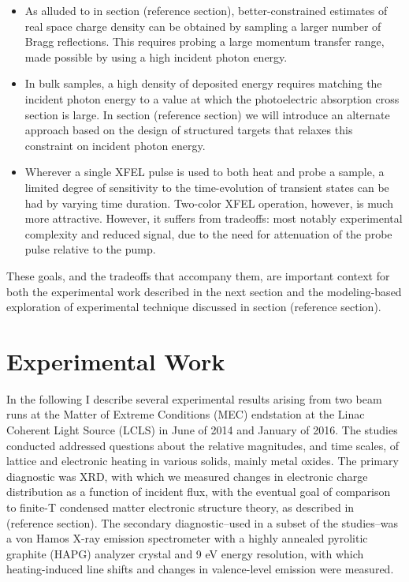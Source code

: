 \documentclass [11pt, proquest, article] {uwthesis}[2016/11/22]
\begin{document}
\begin{itemize}
\item{As alluded to in section (reference section), better-constrained estimates of real space charge density can be obtained by sampling a larger number of Bragg reflections. This requires probing a large momentum transfer range, made possible by using a high incident photon energy.}
\item{In bulk samples, a high density of deposited energy requires matching the incident photon energy to a value at which the photoelectric absorption cross section is large. In section (reference section) we will introduce an alternate approach based on the design of structured targets that relaxes this constraint on incident photon energy.}
\item{Wherever a single XFEL pulse is used to both heat and probe a sample, a limited degree of sensitivity to the time-evolution of transient states can be had by varying time duration. Two-color XFEL operation, however, is much more attractive. However, it suffers from tradeoffs: most notably experimental complexity and reduced signal, due to the need for attenuation of the probe pulse relative to the pump. }
\end{itemize}
These goals, and the tradeoffs that accompany them, are important context for both the experimental work described in the next section and the modeling-based exploration of experimental technique discussed in section (reference section).

\section{Experimental Work}
In the following I describe several experimental results arising from two beam runs at the Matter of Extreme Conditions (MEC) endstation at the Linac Coherent Light Source (LCLS) in June of 2014 and January of 2016. The studies conducted addressed questions about the relative magnitudes, and time scales, of lattice and electronic heating in various solids, mainly metal oxides. The primary diagnostic was XRD, with which we measured changes in electronic charge distribution as a function of incident flux, with the eventual goal of comparison to finite-T condensed matter electronic structure theory, as described in (reference section). The secondary diagnostic--used in a subset of the studies--was a von Hamos X-ray emission spectrometer with a highly annealed pyrolitic graphite (HAPG) analyzer crystal and 9 eV energy resolution, with which heating-induced line shifts and changes in valence-level emission were measured. 
\end{document}
